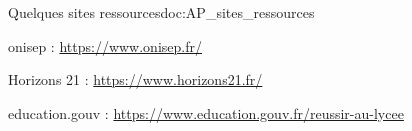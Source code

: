 \begin{doc}{Quelques sites ressources}{doc:AP_sites_ressources}
  \begin{listePoints}
    \item onisep : \url{https://www.onisep.fr/}  
    
    \item Horizons 21 : \url{https://www.horizons21.fr/}
    \item education.gouv : \url{https://www.education.gouv.fr/reussir-au-lycee}
  \end{listePoints}
\end{doc}